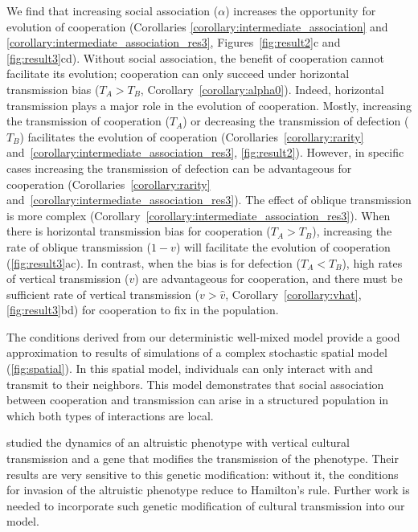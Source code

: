 \documentclass[12pt]{extarticle}
\begin{document}
{We find that increasing social association ($\alpha$) increases the opportunity for evolution of cooperation (Corollaries \ref{corollary:intermediate_association} and \ref{corollary:intermediate_association_res3}, Figures~\ref{fig:result2}c and \ref{fig:result3}cd).
Without social association, the benefit of cooperation cannot facilitate its evolution; cooperation can only succeed under horizontal transmission bias ($T_A>T_B$, Corollary~\ref{corollary:alpha0}). 
Indeed, horizontal transmission plays a major role in the evolution of cooperation. Mostly, increasing the transmission of cooperation ($T_A$) or decreasing the transmission of defection ($T_B$) facilitates the evolution of cooperation (Corollaries~\ref{corollary:rarity} and~\ref{corollary:intermediate_association_res3}, \autoref{fig:result2}). 
However, in specific cases increasing the transmission of defection can be advantageous for cooperation (Corollaries~\ref{corollary:rarity} and~\ref{corollary:intermediate_association_res3}).
The effect of oblique transmission is more complex (Corollary~\ref{corollary:intermediate_association_res3}). 
When there is horizontal transmission bias for cooperation ($T_A>T_B$), increasing the rate of oblique transmission ($1-v$) will facilitate the evolution of cooperation (\autoref{fig:result3}ac).
In contrast, when the bias is for defection ($T_A<T_B$), high rates of vertical transmission ($v$) are advantageous for cooperation, and there must be sufficient rate of vertical transmission ($v>\hat v$, Corollary~\autoref{corollary:vhat}, \autoref{fig:result3}bd) for cooperation to fix in the population.

The conditions derived from our deterministic well-mixed model provide a good approximation to results of simulations of a complex stochastic spatial model  (\autoref{fig:spatial}).
In this spatial model, individuals can only interact with and transmit to their neighbors.
This model demonstrates that social association between cooperation and transmission can arise in a structured population in which both types of interactions are local.

\citet{feldman1985gene} studied the dynamics of an altruistic phenotype with vertical cultural transmission and a gene that modifies the transmission of the phenotype. Their results are very sensitive to this genetic modification: without it, the conditions for invasion of the altruistic phenotype reduce to Hamilton's rule.
Further work is needed to incorporate such genetic modification of cultural transmission into our model.

}
\end{document}
